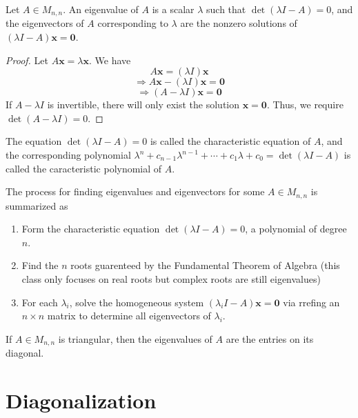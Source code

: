 \begin{theorem}
    Let \(A\in M_{n,n}\). An eigenvalue of \(A\) is a scalar \(\lambda \) such that \(\det \left( \lambda I - A \right)=0 \), and the eigenvectors of \(A\) corresponding to \(\lambda \) are the nonzero solutions of \(\left( \lambda I-A \right)\mathbf{x} =\mathbf{0}  \).
\end{theorem}
\begin{proof}
    Let \(A \mathbf{x} =\lambda \mathbf{x} \). We have
    \[
        A \mathbf{x} = (\lambda I)\mathbf{x}
    \]
    \[
        \Longrightarrow A \mathbf{x} -(\lambda I)\mathbf{x} = \mathbf{0} 
    \]
    \[
        \Longrightarrow (A-\lambda I)\mathbf{x} =\mathbf{0} 
    \]
    If \(A-\lambda I\) is invertible, there will only exist the solution \(\mathbf{x} =\mathbf{0} \). Thus, we require \(\det (A-\lambda I)=0\).
\end{proof}
\begin{remark}
    The equation \(\det (\lambda I-A)=0\) is called the characteristic equation of \(A\), and the corresponding polynomial \(\lambda ^n + c_{n-1}\lambda^{n-1}+\cdots+c_1 \lambda  + c_0=\det (\lambda I-A ) \) is called the caracteristic polynomial of \(A\).
\end{remark}
The process for finding eigenvalues and eigenvectors for some \(A\in M_{n,n}\) is summarized as
\begin{enumerate}
    \item Form the characteristic equation \(\det (\lambda I-A)=0\), a polynomial of degree \(n\).
    \item Find the \(n\) roots guarenteed by the Fundamental Theorem of Algebra (this class only focuses on real roots but complex roots are still eigenvalues)
    \item For each \(\lambda _i\), solve the homogeneous system \((\lambda_i I - A)\mathbf{x} =\mathbf{0} \) via rrefing an \(n\times n\) matrix to determine all eigenvectors of \(\lambda_i\).
\end{enumerate}
\begin{theorem}
    If \(A\in M_{n,n}\) is triangular, then the eigenvalues of \(A\) are the entries on its diagonal.
\end{theorem}
\section{Diagonalization}